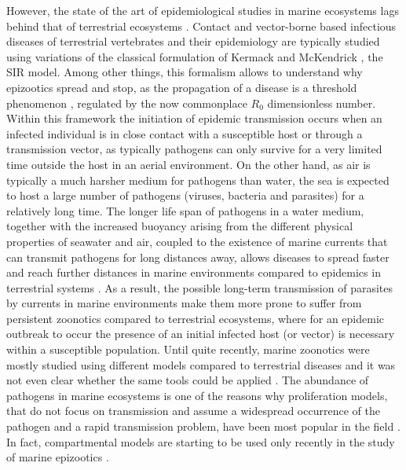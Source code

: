 However, the state of the art of epidemiological studies in marine
ecosystems lags behind that of terrestrial ecosystems \cite{Harvell2004}.
Contact and vector-borne based infectious diseases of terrestrial
vertebrates and their epidemiology are typically studied using variations of
the classical formulation of Kermack and McKendrick \cite{McKendrick,
    McKendrick_2, McKendrick_3}, the SIR model. Among other things, this
formalism
allows to understand why epizootics spread and stop, as the propagation of a
disease is a threshold phenomenon \cite{Anderson1991}, regulated by the now
commonplace  $R_0$ dimensionless number. Within this framework the initiation
of epidemic transmission occurs when an infected individual is in close contact
with a susceptible host or through a transmission vector, as typically
pathogens can only survive for a very limited time outside the host in an
aerial environment.
On the other hand, as air is typically a much harsher medium for pathogens
than water, the sea is expected to host a large number of pathogens (viruses,
bacteria and parasites) for a relatively long time. The longer life span of
pathogens in a water medium,
together with the increased buoyancy arising from the different physical
properties of seawater and air, coupled to the existence of marine currents
that can transmit pathogens for long distances away,
allows diseases to spread faster and reach further distances in marine
environments compared to epidemics in terrestrial systems
\cite{CANTRELL2020239}.
As a result, the possible long-term transmission of parasites by currents
in marine environments make them more prone to suffer from persistent zoonotics
compared to terrestrial ecosystems, where for an epidemic outbreak to occur the
presence of an initial infected host (or vector) is necessary within a
susceptible population.
Until quite recently, marine zoonotics were mostly studied using different
models compared to terrestrial diseases and it was not even clear whether
the same tools could be applied \cite{MCCALLUM_intro}.
The abundance of pathogens in marine ecosystems is one of the reasons why
proliferation models, that do not focus on transmission and assume a widespread
occurrence of the pathogen and a rapid transmission problem, have been most
popular in the field \cite{Powell2015}.
In fact, compartmental models are starting to be used only recently in the
study of marine epizootics \cite{article_SIP}.

